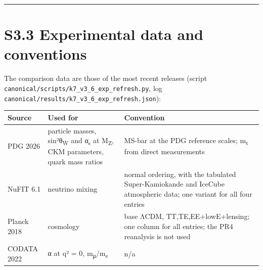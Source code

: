 \documentclass[11pt,a4paper]{article}
\begin{document}
\begin{center}\rule{\linewidth}{0.5pt}\end{center}

\section{S3.3 Experimental data and conventions}\label{s3.3-experimental-data-and-conventions}

The comparison data are those of the most recent releases (script \texttt{canonical/\allowbreak{}scripts/\allowbreak{}k7\_\allowbreak{}v3\_\allowbreak{}6\_\allowbreak{}exp\_\allowbreak{}refresh.\allowbreak{}py}, log \texttt{canonical/\allowbreak{}results/\allowbreak{}k7\_\allowbreak{}v3\_\allowbreak{}6\_\allowbreak{}exp\_\allowbreak{}refresh.\allowbreak{}json}):

\begin{longtable}[]{@{}
  >{\raggedright\arraybackslash}p{}
  >{\raggedright\arraybackslash}p{}
  >{\raggedright\arraybackslash}p{}@{}}
\toprule\noalign{}
\begin{minipage}[b]{\linewidth}\raggedright
Source
\end{minipage} & \begin{minipage}[b]{\linewidth}\raggedright
Used for
\end{minipage} & \begin{minipage}[b]{\linewidth}\raggedright
Convention
\end{minipage} \\
\midrule\noalign{}
\endhead
\bottomrule\noalign{}
\endlastfoot
PDG 2026 \cite{1} & particle masses, sin²θ\textsubscript{W} and α\textsubscript{s} at M\textsubscript{Z}, CKM parameters, quark mass ratios & MS-bar at the PDG reference scales; m\textsubscript{t} from direct measurements \\
NuFIT 6.1 \cite{27} & neutrino mixing & normal ordering, with the tabulated Super-Kamiokande and IceCube atmospheric data; one variant for all four entries \\
Planck 2018 \cite{3} & cosmology & base ΛCDM, TT,TE,EE+lowE+lensing; one column for all entries; the PR4 reanalysis \cite{49} is not used \\
CODATA 2022 \cite{50} & α at q² = 0, m\textsubscript{μ}/m\textsubscript{e} & n/a \\
\end{longtable}
\end{document}
